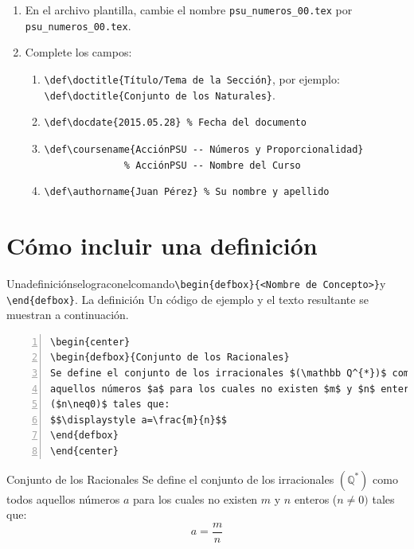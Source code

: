 \documentclass[11pt,letterpaper,twoside]{report}%
\def\doctitle{Plantilla \LaTeX para Informes} %
\def\docdate{2015.05.28} %
\def\coursename{IRB2002 -- Diseño de Sistemas Robóticos} %
\def\authorname{Miguel Torres} %
\begin{document}
\begin{enumerate}
\item En el archivo plantilla, cambie el nombre \texttt{psu\_numeros\_00.tex} por  \texttt{psu\_numeros\_00.tex}.
\item Complete los campos:
  \begin{enumerate}
\item \verb|\def\doctitle{Título/Tema de la Sección}|, por ejemplo:\\
\verb|\def\doctitle{Conjunto de los Naturales}|.
  \item \verb|\def\docdate{2015.05.28} % Fecha del documento|
	\item \verb|\def\coursename{AcciónPSU -- Números y Proporcionalidad}|\\
	      \verb|              % AcciónPSU -- Nombre del Curso|
	\item \verb|\def\authorname{Juan Pérez} % Su nombre y apellido|
	\end{enumerate}
\end{enumerate}


\section{Cómo incluir una definición}\label{sec:definicion}

Una\hfill definición\hfill se\hfill logra\hfill con\hfill el\hfill comando\hfill \verb|\begin{defbox}{<Nombre de Concepto>}|\hfill y \\
\verb|\end{defbox}|. La definición Un código de ejemplo y el texto resultante se muestran a continuación.

\begin{Verbatim}[frame=single,framesep=5mm,rulecolor=\color{gray},numbers=left,numbersep=-10pt]
\begin{center}
\begin{defbox}{Conjunto de los Racionales}
Se define el conjunto de los irracionales $(\mathbb Q^{*})$ como todos
aquellos números $a$ para los cuales no existen $m$ y $n$ enteros 
($n\neq0)$ tales que:
$$\displaystyle a=\frac{m}{n}$$
\end{defbox}
\end{center}
\end{Verbatim}

\begin{center}
\begin{defbox}{Conjunto de los Racionales}
Se define el conjunto de los irracionales $(\mathbb Q^{*})$ como todos aquellos números $a$ para los cuales
    no existen $m$ y $n$ enteros ($n\neq0)$ tales que:
$$\displaystyle a=\frac{m}{n}$$
\end{defbox}
\end{center}
\end{document}
